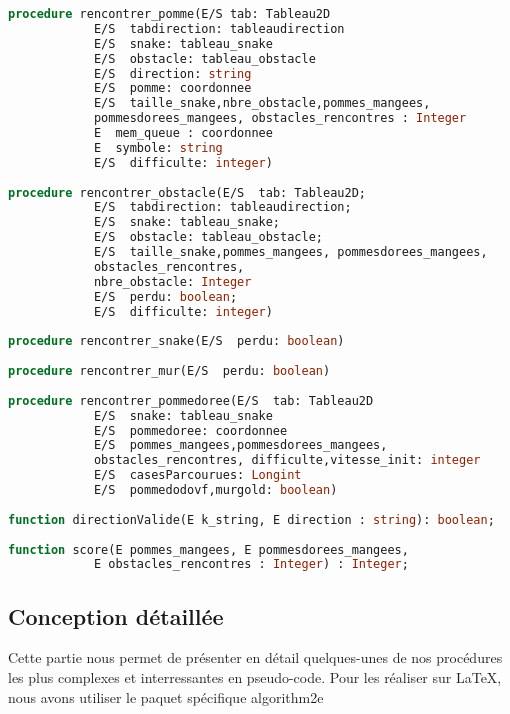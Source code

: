            \clearpage
            
            \begin{lstlisting}[language=Pascal,frame=single]
procedure rencontrer_pomme(E/S tab: Tableau2D
            E/S  tabdirection: tableaudirection
            E/S  snake: tableau_snake
            E/S  obstacle: tableau_obstacle
            E/S  direction: string
            E/S  pomme: coordonnee
            E/S  taille_snake,nbre_obstacle,pommes_mangees, 
            pommesdorees_mangees, obstacles_rencontres : Integer
            E  mem_queue : coordonnee 
            E  symbole: string
            E/S  difficulte: integer)
            
procedure rencontrer_obstacle(E/S  tab: Tableau2D; 
            E/S  tabdirection: tableaudirection; 
            E/S  snake: tableau_snake; 
            E/S  obstacle: tableau_obstacle; 
            E/S  taille_snake,pommes_mangees, pommesdorees_mangees,
            obstacles_rencontres,
            nbre_obstacle: Integer
            E/S  perdu: boolean;
            E/S  difficulte: integer) 
            
procedure rencontrer_snake(E/S  perdu: boolean) 
            
procedure rencontrer_mur(E/S  perdu: boolean) 
            
procedure rencontrer_pommedoree(E/S  tab: Tableau2D
            E/S  snake: tableau_snake
            E/S  pommedoree: coordonnee
            E/S  pommes_mangees,pommesdorees_mangees, 
            obstacles_rencontres, difficulte,vitesse_init: integer
            E/S  casesParcourues: Longint
            E/S  pommedodovf,murgold: boolean)
                                            
function directionValide(E k_string, E direction : string): boolean;
            
function score(E pommes_mangees, E pommesdorees_mangees, 
            E obstacles_rencontres : Integer) : Integer;                                 
            \end{lstlisting}
            
            \clearpage

    \subsection{Conception détaillée}
        Cette partie nous permet de présenter en détail quelques-unes de nos procédures les plus complexes et interressantes en pseudo-code. Pour les réaliser sur \LaTeX{}, nous avons utiliser le paquet spécifique algorithm2e
        
